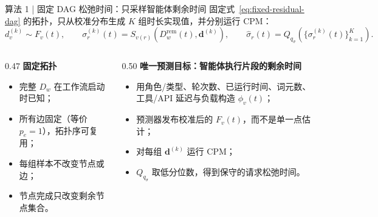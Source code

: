 \begin{frame}{算法 1 | 固定 DAG 松弛时间：只采样智能体剩余时间}
  \small
  固定式~\eqref{eq:fixed-residual-dag} 的拓扑，只从校准分布生成
  $K$ 组时长实现值，并分别运行 CPM：
  \begin{equation}
    d_v^{(k)}\sim F_v(t),
    \qquad
    \sigma_r^{(k)}(t)
    =
    S_{v(r)}\!\left(D_w^{\mathrm{rem}}(t),\boldsymbol d^{(k)}\right),
    \qquad
    \widehat\sigma_r(t)
    =
    Q_{q_\sigma}
    \!\left(
      \{\sigma_r^{(k)}(t)\}_{k=1}^{K}
    \right).
    \label{eq:request-slack}
  \end{equation}

  \begin{columns}[T,onlytextwidth]
    \begin{column}{0.47\textwidth}
      \scriptsize
      \textbf{固定拓扑}
      \begin{itemize}\tightitems
        \item 完整 $D_w$ 在工作流启动时已知；
        \item 所有边固定（等价 $p_e=1$），拓扑序可复用；
        \item 每组样本不改变节点或边；
        \item 节点完成只改变剩余节点集合。
      \end{itemize}
    \end{column}
    \begin{column}{0.50\textwidth}
      \scriptsize
      \textbf{唯一预测目标：智能体执行片段的剩余时间}
      \begin{itemize}\tightitems
        \item 用角色/类型、轮次数、已运行时间、词元数、
          工具/API 延迟与负载构造 $\phi_v(t)$；
        \item 预测器发布校准后的 $F_v(t)$，而不是单一点估计；
        \item 对每组 $\boldsymbol d^{(k)}$ 运行 CPM；
        \item $Q_{q_\sigma}$ 取低分位数，得到保守的请求松弛时间。
      \end{itemize}
    \end{column}
  \end{columns}

  \vspace{0.07cm}
\end{frame}

